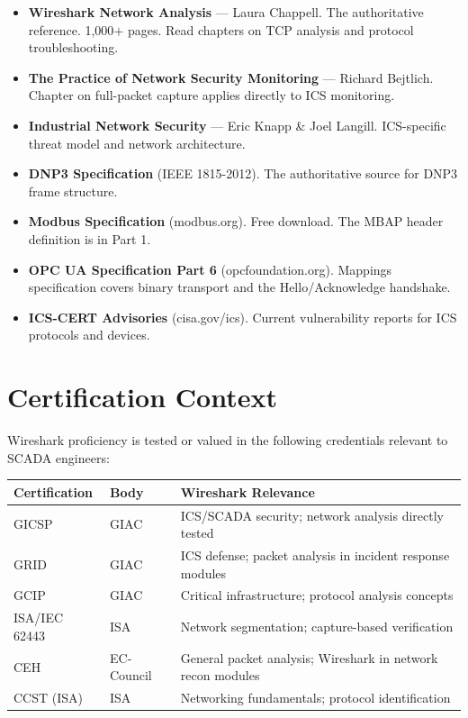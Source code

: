 \documentclass[12pt,twoside,openright]{memoir}
\begin{document}
\begin{itemize}[noitemsep]
  \item \textbf{Wireshark Network Analysis} --- Laura Chappell. The authoritative reference. 1,000$+$ pages. Read chapters on TCP analysis and protocol troubleshooting.
  \item \textbf{The Practice of Network Security Monitoring} --- Richard Bejtlich. Chapter on full-packet capture applies directly to ICS monitoring.
  \item \textbf{Industrial Network Security} --- Eric Knapp \& Joel Langill. ICS-specific threat model and network architecture.
  \item \textbf{DNP3 Specification} (IEEE 1815-2012). The authoritative source for DNP3 frame structure.
  \item \textbf{Modbus Specification} (modbus.org). Free download. The MBAP header definition is in Part 1.
  \item \textbf{OPC UA Specification Part 6} (opcfoundation.org). Mappings specification covers binary transport and the Hello/Acknowledge handshake.
  \item \textbf{ICS-CERT Advisories} (cisa.gov/ics). Current vulnerability reports for ICS protocols and devices.
\end{itemize}

\chapter*{Certification Context}

Wireshark proficiency is tested or valued in the following credentials relevant to SCADA engineers:

\begin{center}
\begin{tabular}{L{3.5cm}L{3cm}L{5cm}}
\toprule
{}
\textbf{Certification} & \textbf{Body} & \textbf{Wireshark Relevance} \\
\midrule
GICSP & GIAC & ICS/SCADA security; network analysis directly tested \\
GRID & GIAC & ICS defense; packet analysis in incident response modules \\
GCIP & GIAC & Critical infrastructure; protocol analysis concepts \\
ISA/IEC 62443 & ISA & Network segmentation; capture-based verification \\
CEH & EC-Council & General packet analysis; Wireshark in network recon modules \\
CCST (ISA) & ISA & Networking fundamentals; protocol identification \\
\bottomrule
\end{tabular}
\end{center}
\end{document}

